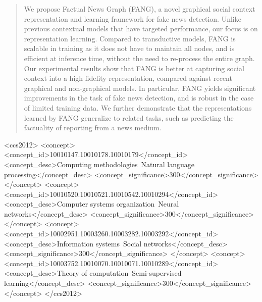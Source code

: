\documentclass[sigconf,anonymous]{acmart}
\theoremstyle{definition}
\theoremstyle{hypothesis}
\begin{document}
\begin{abstract}
We propose Factual News Graph (FANG), a novel graphical social context representation and learning framework for fake news detection. 
Unlike previous contextual models that have targeted performance, our focus is on representation learning.  
Compared to transductive models, FANG is scalable in training as it does not have to maintain all nodes, and is efficient at inference time, without the need to re-process the entire graph.
Our experimental results show that FANG is better at capturing social context into a high fidelity representation, compared against recent graphical and non-graphical models. In particular, FANG yields significant improvements in the task of fake news detection, and is robust in the case of limited training data. We further demonstrate that the representations learned by FANG generalize to related tasks, such as predicting the factuality of reporting from a news medium. 
\end{abstract}


\begin{CCSXML}
<ccs2012>
<concept>
<concept_id>10010147.10010178.10010179</concept_id>
<concept_desc>Computing methodologies~Natural language processing</concept_desc>
<concept_significance>300</concept_significance>
</concept>
<concept>
<concept_id>10010520.10010521.10010542.10010294</concept_id>
<concept_desc>Computer systems organization~Neural networks</concept_desc>
<concept_significance>300</concept_significance>
</concept>
<concept>
<concept_id>10002951.10003260.10003282.10003292</concept_id>
<concept_desc>Information systems~Social networks</concept_desc>
<concept_significance>300</concept_significance>
</concept>
<concept>
<concept_id>10003752.10010070.10010071.10010289</concept_id>
<concept_desc>Theory of computation~Semi-supervised learning</concept_desc>
<concept_significance>300</concept_significance>
</concept>
</ccs2012>
\end{CCSXML}
\end{document}
